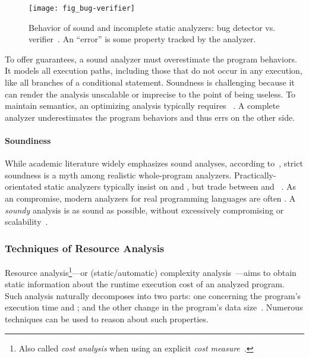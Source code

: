 \begin{figure}[t]
\centering
\texttt{[image: fig\_bug-verifier]}
\caption[Sound and incomplete bug detector vs. verifier]{
Behavior of sound and incomplete static analyzers: bug detector vs.
verifier~\cite{moller2024}. An \enquote{error} is some property tracked
by the analyzer.}
\label{fig:bug-verify}
\end{figure}

To offer guarantees, a sound analyzer must overestimate the program behaviors.
It models all execution paths, including those that do not occur in any
execution, like all branches of a conditional statement.
Soundness is challenging because it can render the analysis
unscalable or imprecise to the point of being useless. To maintain semantics, an
optimizing analysis typically requires ~\cite[p. 5]{moller2023}.
A complete analyzer underestimates the program behaviors and
thus errs on the other side.

\paragraph*{Soundiness}
While academic literature widely emphasizes sound analyses, according
to~\textcite{livshits2015}, strict soundness is a myth among realistic
whole-program analyzers. Practically-orientated static analyzers typically
insist on  and , but trade between
 and ~\cite{moller2023,steffen2020}. As an
compromise, modern analyzers for real programming languages are often
. A \emph{soundy} analysis is as sound as possible, without
excessively compromising  or scalability~\cite{livshits2015}.

\subsubsection{Techniques of Resource Analysis}
\label{resource-analysis}

Resource analysis\footnote{Also called \emph{cost
analysis} when using an explicit \emph{cost measure}~\cite{albert2008}. }---or (static/automatic) {complexity
analysis}~\cite{rosendahl1989,leivant2013}---aims to obtain static information
about the runtime execution cost of an analyzed program. Such analysis naturally
decomposes into two parts: one concerning the program's execution
time and ; and the other change in the
program's data size~\cite{jones2009}. Numerous
techniques can be used to reason about such properties.


